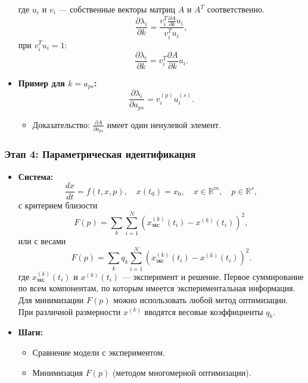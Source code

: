 \begin{itemize}[leftmargin=1em]
		где $u_i$ и $v_i$ — собственные векторы матриц $A$ и $A^T$ соответственно.
		\begin{equation}
			\frac{\partial \lambda_i}{\partial k} = \frac{v_i^T \frac{\partial A}{\partial k} u_i}{v_i^T u_i},
		\end{equation}
		при \(v_i^T u_i = 1\):
		\begin{equation}
			\frac{\partial \lambda_i}{\partial k} = v_i^T \frac{\partial A}{\partial k} u_i.
		\end{equation}
		\item \textbf{Пример для \(k = a_{ps}\):}
		\begin{equation}
			\frac{\partial \lambda_i}{\partial a_{ps}} = v_i^{(p)} u_i^{(s)}.
		\end{equation}
		\begin{itemize}
			\item Доказательство: \(\frac{\partial A}{\partial a_{ps}}\) имеет один ненулевой элемент.
		\end{itemize}
	\end{itemize}
	
	\subsubsection{Этап 4: Параметрическая идентификация}
	\begin{itemize}[leftmargin=1em]
		\item \textbf{Система:}
		\begin{equation}
			\frac{d x}{d t} = f(t, x, p), \quad x(t_0) = x_0, \quad x \in \mathbb{R}^m, \quad p \in \mathbb{R}^s,
		\end{equation}
		с критерием близости
		\begin{equation}
			F(p) = \sum_k \sum_{i=1}^N (x_{\text{экс}}^{(k)}(t_i) - x^{(k)}(t_i))^2,
		\end{equation}
		или с весами
		\begin{equation}
			F(p) = \sum_k q_k \sum_{i=1}^N (x_{\text{экс}}^{(k)}(t_i) - x^{(k)}(t_i))^2.
		\end{equation}
		где $x_{\text{экс}}^{(k)}(t_i)$ и $x^{(k)}(t_i)$ — эксперимент и решение. 
		\newline
		Первое суммирование по всем компонентам, по которым имеется экспериментальная информация. 
		\newline
		Для минимизации $F(p)$ можно использовать любой метод оптимизации. 
		\newline
		При различной размерности $x^{(k)}$ вводятся весовые коэффициенты $q_k$.
		\item \textbf{Шаги:}
		\begin{itemize}
			\item Сравнение модели с экспериментом.
			\item Минимизация \(F(p)\) (методом многомерной оптимизации).
		\end{itemize}
	\end{itemize}
	
